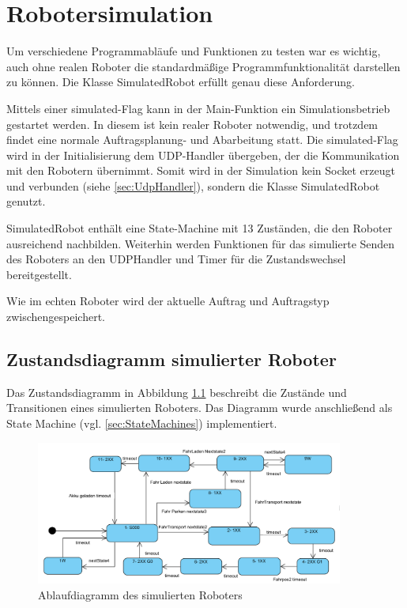 
\chapter{Robotersimulation}
\label{sec:Simulation}

Um verschiedene Programmabläufe und Funktionen zu testen war es wichtig, auch ohne realen Roboter die standardmäßige Programmfunktionalität darstellen zu können. Die Klasse SimulatedRobot erfüllt genau diese Anforderung. 

Mittels einer simulated-Flag kann in der Main-Funktion ein Simulationsbetrieb gestartet werden. In diesem ist kein realer Roboter notwendig, und trotzdem findet eine normale Auftragsplanung- und Abarbeitung statt. Die simulated-Flag wird in der Initialisierung dem UDP-Handler übergeben, der die Kommunikation mit den Robotern übernimmt. Somit wird in der Simulation kein Socket erzeugt und verbunden (siehe \ref{sec:UdpHandler}), sondern die Klasse SimulatedRobot genutzt. 

SimulatedRobot enthält eine State-Machine mit 13 Zuständen, die den Roboter ausreichend nachbilden. Weiterhin werden Funktionen für das simulierte Senden des Roboters an den UDPHandler und Timer für die Zustandswechsel bereitgestellt. 

Wie im echten Roboter wird der aktuelle Auftrag und Auftragstyp zwischengespeichert. 

\section{Zustandsdiagramm simulierter Roboter}

Das Zustandsdiagramm in Abbildung \ref{fig:simRobot} beschreibt die Zustände und Transitionen eines simulierten Roboters. Das Diagramm wurde anschließend als State Machine (vgl. \ref{sec:StateMachines}) implementiert. 

\begin{figure}[htb]
    \centering
    \includegraphics[width=0.9\textwidth]{Abbildungen/SimulatedRobot.PNG}
    \caption{Ablaufdiagramm des simulierten Roboters}		
    \label{fig:simRobot}
\end{figure}

